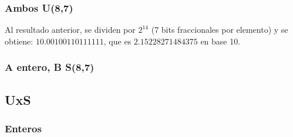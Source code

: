 \subsubsection{Ambos U(8,7)}
Al resultado anterior, se dividen por $2^{14}$ (7 bits fraccionales por elemento) y se obtiene: $10.00100110111111$, que es $2.15228271484375$ en base 10. 

\subsubsection{A entero, B S(8,7)}

\subsection{UxS}

\subsubsection{Enteros}
